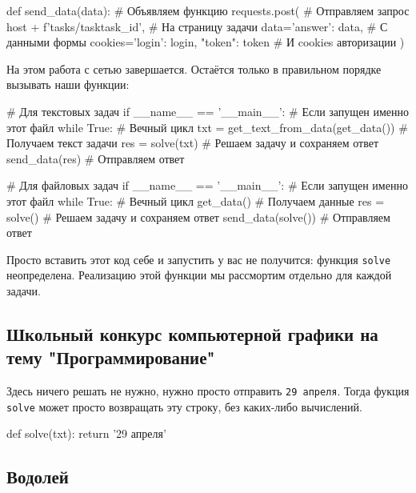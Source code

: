 \documentclass[12pt]{article}
\begin{document}
	\begin{pythoncode}
def send_data(data):                              # Объявляем функцию
    requests.post(                                # Отправляем запрос
        host + f'tasks/task{task_id}',            # На страницу задачи
        data={'answer': data},                    # С данными формы
        cookies={'login': login, "token": token}  # И cookies авторизации
    )
 	\end{pythoncode}
	
	На этом работа с сетью завершается. Остаётся только в правильном порядке вызывать наши функции:
	
	\begin{pythoncode}
# Для текстовых задач
if __name__ == '__main__':                        # Если запущен именно этот файл
    while True:                                   # Вечный цикл
        txt = get_text_from_data(get_data())      # Получаем текст задачи
        res = solve(txt)                          # Решаем задачу и сохраняем ответ
        send_data(res)                            # Отправляем ответ
 	\end{pythoncode}
	
	\begin{pythoncode}
# Для файловых задач
if __name__ == '__main__':                        # Если запущен именно этот файл
    while True:                                   # Вечный цикл
        get_data()                                # Получаем данные
        res = solve()                             # Решаем задачу и сохраняем ответ
        send_data(solve())                        # Отправляем ответ
 	\end{pythoncode}
 	
 	Просто вставить этот код себе и запустить у вас не получится: функция \verb|solve| неопределена. Реализацию этой функции мы рассмортим отдельно для каждой задачи.

	\newpage
	\subsection{Школьный конкурс компьютерной графики на тему "Программирование"}
	Здесь ничего решать не нужно, нужно просто отправить \verb|29 апреля|. Тогда фукция \verb|solve| может просто возвращать эту строку, без каких-либо вычислений.
	\begin{pythoncode}
def solve(txt):
    return '29 апреля'
 	\end{pythoncode}
 	
 	\newpage
	\subsection{Водолей}
	
\end{document}
